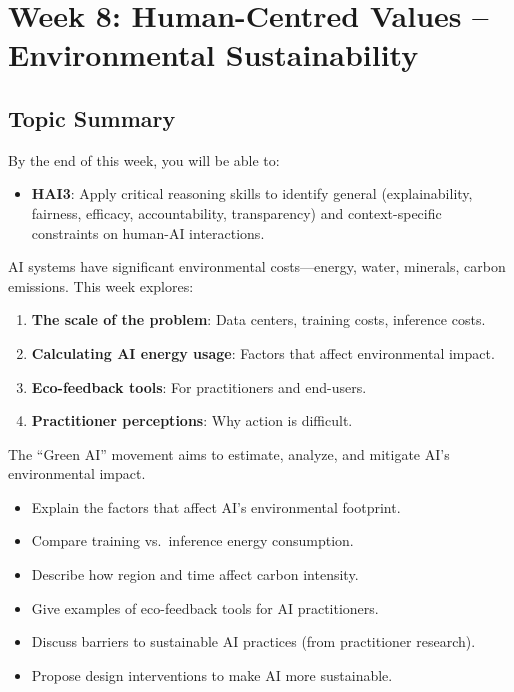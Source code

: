\section{Week 8: Human-Centred Values -- Environmental Sustainability}

\subsection{Topic Summary}

\begin{keybox}
By the end of this week, you will be able to:
\begin{itemize}
  \item \textbf{HAI3}: Apply critical reasoning skills to identify general (explainability, fairness, efficacy, accountability, transparency) and context-specific constraints on human-AI interactions.
\end{itemize}
\end{keybox}

\begin{keybox}
AI systems have significant environmental costs---energy, water, minerals, carbon emissions. This week explores:
\begin{enumerate}
  \item \textbf{The scale of the problem}: Data centers, training costs, inference costs.
  \item \textbf{Calculating AI energy usage}: Factors that affect environmental impact.
  \item \textbf{Eco-feedback tools}: For practitioners and end-users.
  \item \textbf{Practitioner perceptions}: Why action is difficult.
\end{enumerate}

The ``Green AI'' movement aims to estimate, analyze, and mitigate AI's environmental impact.
\end{keybox}

\begin{keybox}
\begin{itemize}
  \item Explain the factors that affect AI's environmental footprint.
  \item Compare training vs.\ inference energy consumption.
  \item Describe how region and time affect carbon intensity.
  \item Give examples of eco-feedback tools for AI practitioners.
  \item Discuss barriers to sustainable AI practices (from practitioner research).
  \item Propose design interventions to make AI more sustainable.
\end{itemize}
\end{keybox}

